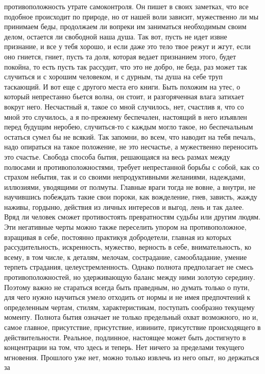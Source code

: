 противоположность утрате самоконтроля. Он пишет в своих заметках, что все
подобное происходит по природе, но от нашей воли зависит, мужественно ли мы
принимаем беды, продолжаем ли вопреки им заниматься необходимым своим делом,
остается ли свободной наша душа. Так вот, пусть не идет извне признание, и все у
тебя хорошо, и если даже это тело твое режут и жгут, если оно гниется, гниет,
пусть та доля, которая ведает признанием этого, будет покойна, то есть пусть так
рассудит, что это не добро, не беда, раз может так случиться и с хорошим
человеком, и с дурным, ты душа на себе труп таскающий. И вот еще с другого места
его книги. Быть похожим на утес, о который непрестанно бьется волна, он стоит, и
разгоряченная влага затихает вокруг него. Несчастный я, такое со мной случилось,
нет, счастлив я, что со мной это случилось, а я по-прежнему беспечален,
настоящий в него изъявлен перед будущим неробею, случиться-то с каждым могло
такое, но беспечальным остаться сумел бы не всякий. Так запомни, во всем, что
наводит на тебя печаль, надо опираться на такое положение, не это несчастье, а
мужественно переносить это счастье. Свобода способа бытия, решающаяся на весь
размах между полюсами и противоположностями, требует непрестанной борьбы с
собой, как со страхом небытия, так и со своими непродуктивными желаниями,
надеждами, иллюзиями, уводящими от полмуты. Главные враги тогда не вовне, а
внутри, не научившись побеждать такие свои пороки, как вожделение, гнев,
зависть, жажду наживы, гордыню, действия из личных интересов и выгод, лень и так
далее. Вряд ли человек сможет противостоять превратностям судьбы или другим
людям. Эти негативные черты можно также переселить упором на противоположное,
взращивая в себе, постоянно практикуя добродетели, главная из которых
рассудительность, искренность, мужество, верность в себе, внимательность, ко
всему, в том числе, к деталям, мелочам, сострадание, самообладание, умение
терпеть страдания, целеустремленность. Однако полнота предполагает не смесь
противоположностей, но удерживающую баланс между ними золотую середину. Поэтому
важно не стараться всегда быть праведным, но думать только о пути, для чего
нужно научиться умело отходить от нормы и не имея предпочтений к определенным
чертам, стилям, характеристикам, поступать сообразно текущему моменту. Полнота
бытия означает не только предельный охват возможного, но и, самое главное,
присутствие, присутствие, извините, присутствие происходящего в
действительности. Реальное, подлинное, настоящее может быть достигнуто в
концентрации на том, что здесь и теперь. Нет ничего за пределами текущего
мгновения. Прошлого уже нет, можно только извлечь из него опыт, но держаться за
